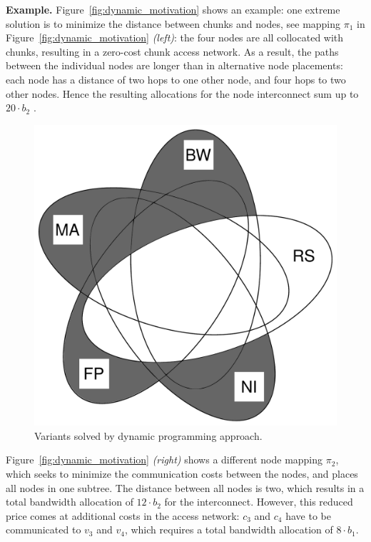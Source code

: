 \documentclass[conference,10pt]{IEEEtran}
\newcommand{\NodeMapping}{\pi}
\newcommand{\CostTrans}{\ensuremath{b_1}}
\newcommand{\CostCom}{\ensuremath{b_2}}
\begin{document}
\textbf{Example.} Figure~\ref{fig:dynamic_motivation} shows an example: one
extreme solution is to minimize the distance between chunks and nodes,
see mapping $\NodeMapping_1$ in
Figure~\ref{fig:dynamic_motivation} \emph{(left)}: the four nodes are all
collocated with chunks, resulting in a zero-cost chunk access network. As a
result, the paths between the individual nodes are longer than in alternative
node placements: each node has a distance of two hops to one other node,
and four hops to two other nodes. Hence the resulting allocations for the
node interconnect sum up to $20 \cdot \CostCom$ .
\begin{figure}
\vspace{-1em}
\includegraphics[width=0.48\columnwidth]{figs/venn_dp.pdf}
\caption{Variants solved by dynamic programming approach.}
\vspace{-1em}
\label{fig:venn_flow}
\end{figure}
Figure~\ref{fig:dynamic_motivation} \emph{(right)} shows a different node
mapping $\NodeMapping_2$, which seeks to minimize the communication costs
between the nodes, and places all nodes in one subtree. The distance between all
nodes is two, which results in a total bandwidth allocation of $12\cdot\CostCom$
for the interconnect. However, this reduced price comes at additional costs in
the access network: $c_3$ and $c_4$ have to be communicated to $v_3$ and $v_4$,
which requires a total bandwidth allocation of $8 \cdot \CostTrans$.
\end{document}
